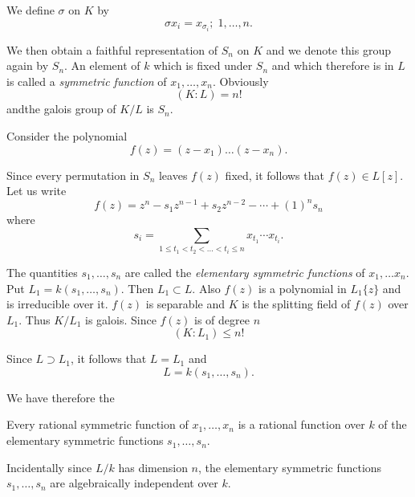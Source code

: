 We define $ \sigma$ on $K$ by
$$
\sigma x_i = x_{\sigma_{i}}  ; \; 1, \ldots , n .
$$

We then obtain a faithful representation of $S_n$  on $K$  and we
denote this  group again by $S_n$. An element of $k$ which is fixed
under $S_n$ and which therefore is in $L$ is called a
\textit{symmetric function} of $ x_1 , \ldots, x_n$. Obviously  
$$
( K :L ) =n!
$$
and\pageoriginale the galois group of $ K / L $ is  $S_n $.

Consider the polynomial 
$$
f (z) = (z- x_1) \ldots (z -x_n ).
$$

Since every permutation in $ S_n $  leaves  $f (z) $ fixed, it follows
that $f(z) \in L [ z ] $. Let us write  
$$
f (z) = z^n- s_1 z^{n-1} + s_2 z^{n-2} - \cdots + ( 1 )^n s_n
$$ 
where 
$$
s_i = \sum_{1 \leq t_1 < t_2 < \ldots < t_i \leq n} x_{t_{1}} \cdots x_{t_{i}}.
$$

The quantities $s_1 , \ldots , s_n$ are called the
\textit{elementary symmetric functions} of $x_1 , \ldots x_n$. Put
$L_1 = k ( s_1 ,\ldots , s_n )$. Then  $ L_1 \subset L $. Also $f
(z)$ is  a polynomial in $ L_1 \{ z \} $ and is irreducible over
it. $f (z)$ is separable and $K$ is the splitting field of $ f(z)$
over $L_1$. Thus $ K/L_1 $ is galois. Since $f(z)$ is of degree
$n$ 
$$
(K : L_1) \leq n! 
$$

Since $L \supset L_1 $, it follows that $ L = L_1 $ and 
$$
 L = k(s_1 ,\ldots , s_n).
$$

We have therefore the 

\begin{thm}\label{c3:thm15}%
 Every rational symmetric function of $ x_1 , \ldots , x_n $ is a
 rational function over $k$ of the elementary symmetric functions $
 s_1 , \ldots , s_n $.
\end{thm}

Incidentally since $L/k$  has dimension $n$, the elementary
symmetric functions $s_1 , \ldots , s_n$ are algebraically
independent over $k$. 

